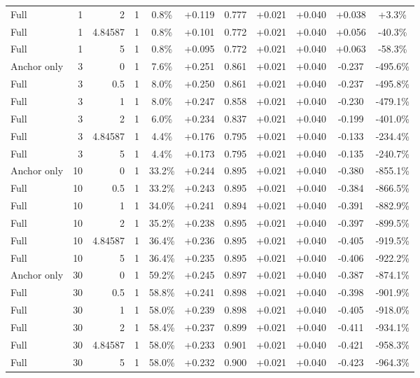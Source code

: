 \begin{table}[htbp]
\begin{tabular}{lrrrccccccc}
Full & 1 & 2 & 1 & 0.8\% & +0.119 & 0.777 & +0.021 & +0.040 & +0.038 & +3.3\% \\
Full & 1 & 4.84587 & 1 & 0.8\% & +0.101 & 0.772 & +0.021 & +0.040 & +0.056 & -40.3\% \\
Full & 1 & 5 & 1 & 0.8\% & +0.095 & 0.772 & +0.021 & +0.040 & +0.063 & -58.3\% \\
Anchor only & 3 & 0 & 1 & 7.6\% & +0.251 & 0.861 & +0.021 & +0.040 & -0.237 & -495.6\% \\
Full & 3 & 0.5 & 1 & 8.0\% & +0.250 & 0.861 & +0.021 & +0.040 & -0.237 & -495.8\% \\
Full & 3 & 1 & 1 & 8.0\% & +0.247 & 0.858 & +0.021 & +0.040 & -0.230 & -479.1\% \\
Full & 3 & 2 & 1 & 6.0\% & +0.234 & 0.837 & +0.021 & +0.040 & -0.199 & -401.0\% \\
Full & 3 & 4.84587 & 1 & 4.4\% & +0.176 & 0.795 & +0.021 & +0.040 & -0.133 & -234.4\% \\
Full & 3 & 5 & 1 & 4.4\% & +0.173 & 0.795 & +0.021 & +0.040 & -0.135 & -240.7\% \\
Anchor only & 10 & 0 & 1 & 33.2\% & +0.244 & 0.895 & +0.021 & +0.040 & -0.380 & -855.1\% \\
Full & 10 & 0.5 & 1 & 33.2\% & +0.243 & 0.895 & +0.021 & +0.040 & -0.384 & -866.5\% \\
Full & 10 & 1 & 1 & 34.0\% & +0.241 & 0.894 & +0.021 & +0.040 & -0.391 & -882.9\% \\
Full & 10 & 2 & 1 & 35.2\% & +0.238 & 0.895 & +0.021 & +0.040 & -0.397 & -899.5\% \\
Full & 10 & 4.84587 & 1 & 36.4\% & +0.236 & 0.895 & +0.021 & +0.040 & -0.405 & -919.5\% \\
Full & 10 & 5 & 1 & 36.4\% & +0.235 & 0.895 & +0.021 & +0.040 & -0.406 & -922.2\% \\
Anchor only & 30 & 0 & 1 & 59.2\% & +0.245 & 0.897 & +0.021 & +0.040 & -0.387 & -874.1\% \\
Full & 30 & 0.5 & 1 & 58.8\% & +0.241 & 0.898 & +0.021 & +0.040 & -0.398 & -901.9\% \\
Full & 30 & 1 & 1 & 58.0\% & +0.239 & 0.898 & +0.021 & +0.040 & -0.405 & -918.0\% \\
Full & 30 & 2 & 1 & 58.4\% & +0.237 & 0.899 & +0.021 & +0.040 & -0.411 & -934.1\% \\
Full & 30 & 4.84587 & 1 & 58.0\% & +0.233 & 0.901 & +0.021 & +0.040 & -0.421 & -958.3\% \\
Full & 30 & 5 & 1 & 58.0\% & +0.232 & 0.900 & +0.021 & +0.040 & -0.423 & -964.3\% \\

\end{tabular}
\end{table}
